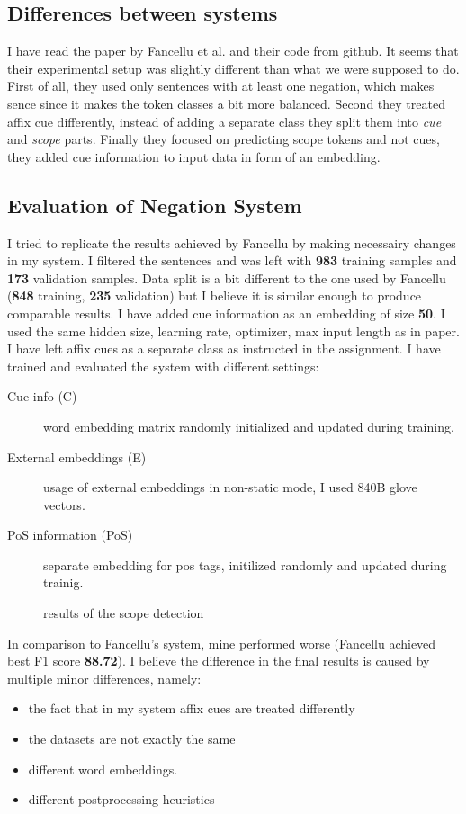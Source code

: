 \documentclass{article}
\begin{document}
\subsection{Differences between systems}
I have read the paper by Fancellu et al. and their code from github. It seems that their
experimental setup was slightly different than what we were supposed to do. First of all,
they used only sentences with at least one negation, which makes sence since it makes the token
classes a bit more balanced. Second they treated affix cue differently, instead of adding
a separate class they split them into \textit{cue} and \textit{scope} parts. Finally they focused
on predicting scope tokens and not cues, they added cue information to input data in form of an embedding.
\subsection{Evaluation of Negation System}
I tried to replicate the results achieved by Fancellu by making necessairy changes in my system.
I filtered the sentences and was left with \textbf{983} training samples and \textbf{173} validation samples.
Data split is a bit different to the one used by Fancellu (\textbf{848} training, \textbf{235} validation) but
I believe it is similar enough to produce comparable results. I have added cue information as an embedding
of size \textbf{50}. I used the same hidden size, learning rate, optimizer, max input length as in paper.
I have left affix cues as a separate class as instructed in the assignment.
I have trained and evaluated the system with different settings:
\begin{description}
\item[Cue info (C)] word embedding matrix randomly initialized and updated during training.
\item[External embeddings (E)] usage of external embeddings in non-static mode, I used 840B glove vectors.
\item[PoS information (PoS)] separate embedding for pos tags, initilized randomly and updated during trainig.
\end{description}

\begin{figure}[h]

\caption{results of the scope detection}
\end{figure}

In comparison to Fancellu's system, mine performed worse (Fancellu achieved best F1 score \textbf{88.72}).
I believe the difference in the final results is caused by multiple minor differences, namely:
\begin{itemize}
\item the fact that in my system affix cues are treated differently
\item the datasets are not exactly the same
\item different word embeddings.
\item different postprocessing heuristics
\end{itemize}
\newpage
\end{document}
